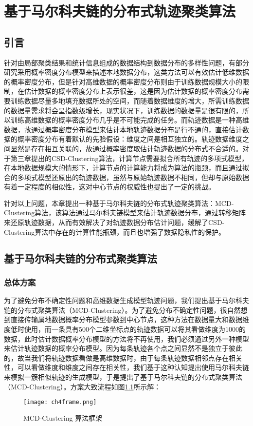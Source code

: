 \chapter{基于马尔科夫链的分布式轨迹聚类算法}


\section{引言}
针对由局部聚类结果和统计信息组成的数据结构到数据分布的多样性问题，有部分研究采用概率密度分布模型来描述本地数据分布，这类方法可以有效估计低维数据的概率密度分布，但是针对高维数据的概率密度分布则由于训练数据规模大小的限制，在估计数据的概率密度分布上表示很差，这是因为估计数据的概率密度分布需要训练数据尽量多地填充数据所处的空间，而随着数据维度的增大，所需训练数据的数据量需求将会呈指数级增长，现实状况下，训练数据的数据量是很有限的，所以训练高维数据的概率密度分布几乎是不可能完成的任务。而轨迹数据是一种高维数据，故通过概率密度分布模型来估计本地轨迹数据分布是行不通的，直接估计数据的概率密度分布有着默认的先验假设：维度之间是相互独立的。轨迹数据维度之间显然是存在相互关联的，故通过概率密度取估计轨迹数据的分布式不合适的。对于第三章提出的CSD-Clustering算法，计算节点需要拟合所有轨迹的多项式模型，在本地数据规模大的情形下，计算节点的计算能力将成为算法的瓶颈，而且通过拟合的多项式模型还原出的轨迹数据，虽然与原始轨迹数据不相同，但却与原始数据有着一定程度的相似性，这对中心节点的权威性也提出了一定的挑战。

针对以上问题，本章提出一种基于马尔科夫链的分布式轨迹聚类算法：MCD-Clustering算法，该算法通过马尔科夫链模型来估计轨迹数据分布，通过转移矩阵来还原轨迹数据，从而有效解决了对轨迹数据分布估计问题，缓解了CSD-Clustering算法中存在的计算性能瓶颈，而且也增强了数据隐私性的保护。

\section{基于马尔科夫链的分布式聚类算法}

\subsection{总体方案}
为了避免分布不确定性问题和高维数据生成模型轨迹问题，我们提出基于马尔科夫链的分布式聚类算法（MCD-Clustering）。为了避免分布不确定性问题，很自然想到直接传输属地数据概率分布模型参数到中心节点，这种方法在数据量大和数据维度低时使用，而一条具有500个二维坐标点的轨迹数据可以将其看做维度为1000的数据，此时估计数据概率分布模型的方法将不再使用，我们必须通过另外一种模型来估计轨迹数据的概率分布模型。因为每条轨迹各个点之间显然不是独立于彼此的，故当我们将轨迹数据看做是高维数据时，由于每条轨迹数据相邻点存在相关性，可以看做维度和维度之间存在相关性，我们基于这种认知提出使用马尔科夫链来模拟一簇相似轨迹的生成模型，于是提出了基于马尔科夫链的分布式聚类算法（MCD-Clustering）。方案大致流程如图\ref{ch4frame}所示解：
\begin{figure}[h]
	\texttt{[image: ch4frame.png]}
	\caption{MCD-Clustering 算法框架}
	\label{ch4frame}
\end{figure}

